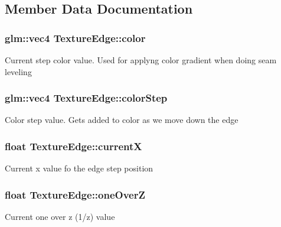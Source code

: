 \subsection{Member Data Documentation}
\hypertarget{class_texture_edge_ab0f8a2b476e5a4bc28f7d95b0753ac69}{}
\subsubsection[{color}]{\setlength{\rightskip}{0pt plus 5cm}glm\+::vec4 Texture\+Edge\+::color}\label{class_texture_edge_ab0f8a2b476e5a4bc28f7d95b0753ac69}
Current step color value. Used for applyng color gradient when doing seam leveling \hypertarget{class_texture_edge_a978d737a720ca72aac38a02e6d190c05}{}
\subsubsection[{color\+Step}]{\setlength{\rightskip}{0pt plus 5cm}glm\+::vec4 Texture\+Edge\+::color\+Step}\label{class_texture_edge_a978d737a720ca72aac38a02e6d190c05}
Color step value. Gets added to color as we move down the edge \hypertarget{class_texture_edge_a7c3b80e498b2695a022e27c9585ce179}{}
\subsubsection[{current\+X}]{\setlength{\rightskip}{0pt plus 5cm}float Texture\+Edge\+::current\+X}\label{class_texture_edge_a7c3b80e498b2695a022e27c9585ce179}
Current x value fo the edge step position \hypertarget{class_texture_edge_a6dd2c8650dd32b7150b3f6b62b338360}{}
\subsubsection[{one\+Over\+Z}]{\setlength{\rightskip}{0pt plus 5cm}float Texture\+Edge\+::one\+Over\+Z}\label{class_texture_edge_a6dd2c8650dd32b7150b3f6b62b338360}
Current one over z (1/z) value \hypertarget{class_texture_edge_a074ed9078d97be9319aa786ffdcf5a2e}{}
